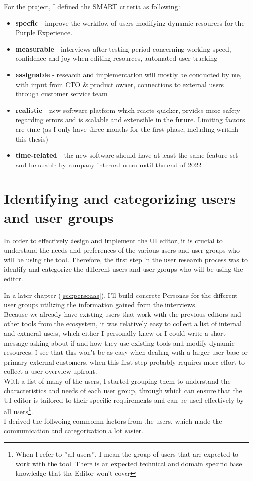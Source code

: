 For the project, I defined the SMART criteria as following:

\begin{itemize}
  \item \textbf{specfic} - improve the workflow of users modifying dynamic resources for the Purple Experience.
  \item \textbf{measurable} - interviews after testing period concerning working speed, confidence and joy when editing resources, automated user tracking
  \item \textbf{assignable} - research and implementation will mostly be conducted by me, with input from CTO \& product owner, connections to external users through customer service team
  \item \textbf{realistic} - new software platform which reacts quicker, prvides more safety regarding errors and is scalable and extensible in the future. Limiting factors are time (as I only have three months for the first phase, including writinh this thesis)
  \item \textbf{time-related} - the new software should have at least the same feature set and be usable by company-internal users until the end of 2022
\end{itemize}

\section{Identifying and categorizing users and user groups}
\label{sec:user-groups}
In order to effectively design and implement the UI editor, it is crucial to understand the needs and preferences of the various users and user groups who will be using the tool.
Therefore, the first step in the user research process was to identify and categorize the different users and user groups who will be using the editor.

In a later chapter (\ref{sec:personas}), I'll build concrete Personas for the different user groups utilizing the information gained from the interviews.
\\
Because we already have existing users that work with the previous editors and other tools from the ecosystem, it was relatively easy to collect a list of internal and extneral users, which either I personally knew or I could write a short message asking about if and how they use existing tools and modify dynamic resources.
I see that this won't be as easy when dealing with a larger user base or primary external customers, when this first step probably requires more effort to collect a user overview upfront.
\\
With a list of many of the users, I started grouping them to understand the characteristics and needs of each user group, through which can ensure that the UI editor is tailored to their specific requirements and can be used effectively by all users\footnote{When I refer to ''all users'', I mean the group of users that are expected to work with the tool. There is an expected technical and domain specific base knowledge that the Editor won't cover}.
\\
I derived the follwoing commomn factors from the users, which made the communication and categorization a lot easier.

